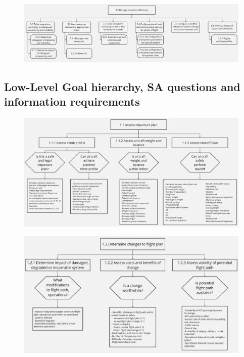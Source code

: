 \documentclass[12pt,a4paper]{article} %
\begin{document}
	\begin{figure}[H]
		\centering
		\includegraphics[width=1.0\textwidth]{./images/GDTA/top-goal-3.jpg}
		\label{gdta:top-3}
	\end{figure}

	\subsection{Low-Level Goal hierarchy, SA questions and information requirements}

	\begin{figure}[H]
		\centering
		\includegraphics[width=1.0\textwidth]{./images/GDTA/bott-goal-1.jpg}
		\label{gdta:bott-1}
	\end{figure}

	\begin{figure}[H]
		\centering
		\includegraphics[width=1.0\textwidth]{./images/GDTA/bott-goal-2.jpg}
		\label{gdta:bott-2}
	\end{figure}
\end{document}
